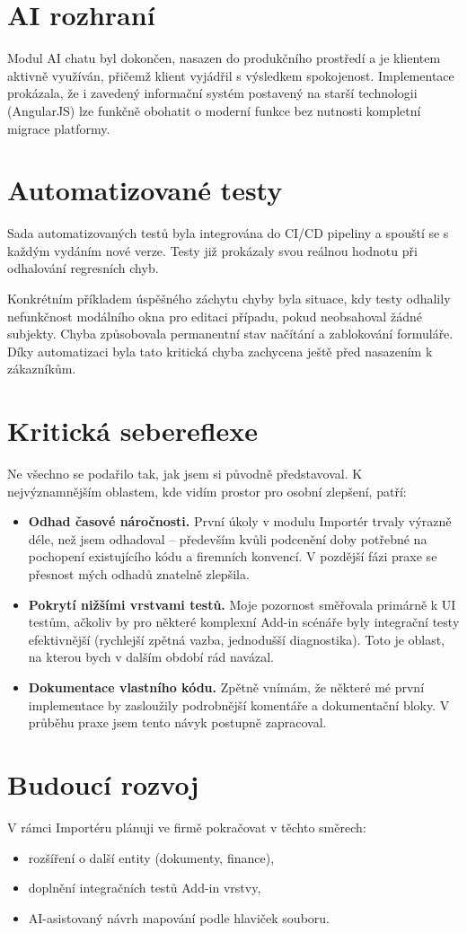 \section{AI rozhraní}
Modul AI chatu byl dokončen, nasazen do produkčního prostředí a je klientem aktivně využíván, přičemž klient vyjádřil s výsledkem spokojenost. Implementace prokázala, že i zavedený informační systém postavený na starší technologii (AngularJS) lze funkčně obohatit o moderní funkce bez nutnosti kompletní migrace platformy.

\section{Automatizované testy}
Sada automatizovaných testů byla integrována do CI/CD pipeliny a spouští se s každým vydáním nové verze. Testy již prokázaly svou reálnou hodnotu při odhalování regresních chyb.

Konkrétním příkladem úspěšného záchytu chyby byla situace, kdy testy odhalily nefunkčnost modálního okna pro editaci případu, pokud neobsahoval žádné subjekty. Chyba způsobovala permanentní stav načítání a zablokování formuláře. Díky automatizaci byla tato kritická chyba zachycena ještě před nasazením k zákazníkům.

\section{Kritická sebereflexe}

Ne všechno se podařilo tak, jak jsem si původně představoval. K nejvýznamnějším oblastem, kde vidím prostor pro osobní zlepšení, patří:
\begin{itemize}
    \item \textbf{Odhad časové náročnosti.} První úkoly v modulu Importér trvaly výrazně déle, než jsem odhadoval -- především kvůli podcenění doby potřebné na pochopení existujícího kódu a firemních konvencí. V pozdější fázi praxe se přesnost mých odhadů znatelně zlepšila.
    \item \textbf{Pokrytí nižšími vrstvami testů.} Moje pozornost směřovala primárně k UI testům, ačkoliv by pro některé komplexní Add-in scénáře byly integrační testy efektivnější (rychlejší zpětná vazba, jednodušší diagnostika). Toto je oblast, na kterou bych v dalším období rád navázal.
    \item \textbf{Dokumentace vlastního kódu.} Zpětně vnímám, že některé mé první implementace by zasloužily podrobnější komentáře a dokumentační bloky. V průběhu praxe jsem tento návyk postupně zapracoval.
\end{itemize}

\section{Budoucí rozvoj}

V rámci Importéru plánuji ve firmě pokračovat v těchto směrech:
\begin{itemize}
    \item rozšíření o další entity (dokumenty, finance),
    \item doplnění integračních testů Add-in vrstvy,
    \item AI-asistovaný návrh mapování podle hlaviček souboru.
\end{itemize}
